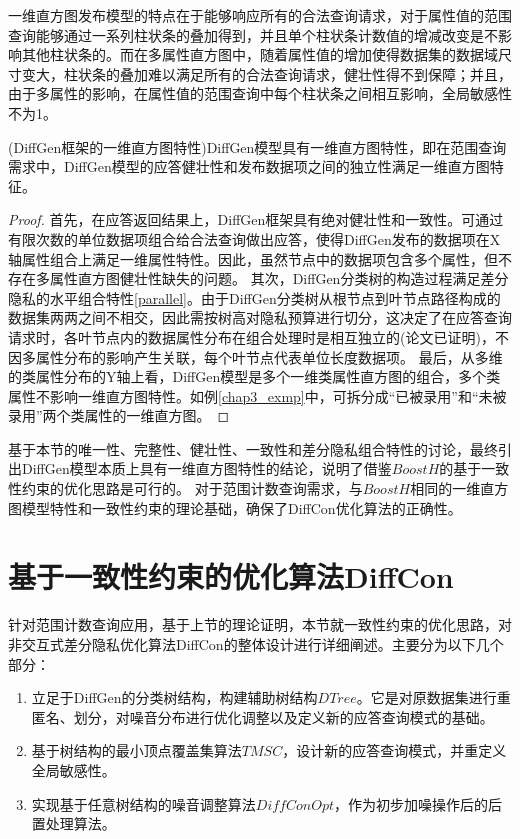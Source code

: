 
一维直方图发布模型的特点在于能够响应所有的合法查询请求，对于属性值的范围查询能够通过一系列柱状条的叠加得到，并且单个柱状条计数值的增减改变是不影响其他柱状条的。而在多属性直方图中，随着属性值的增加使得数据集的数据域尺寸变大，柱状条的叠加难以满足所有的合法查询请求，健壮性得不到保障；并且，由于多属性的影响，在属性值的范围查询中每个柱状条之间相互影响，全局敏感性不为1。

\begin{prop}
	\label{chap4_prop4}
	(DiffGen框架的一维直方图特性)DiffGen模型具有一维直方图特性，即在范围查询需求中，DiffGen模型的应答健壮性和发布数据项之间的独立性满足一维直方图特征。
\end{prop}
\begin{proof}
	首先，在应答返回结果上，DiffGen框架具有绝对健壮性和一致性。可通过有限次数的单位数据项组合给合法查询做出应答，使得DiffGen发布的数据项在X轴属性组合上满足一维属性特性。因此，虽然节点中的数据项包含多个属性，但不存在多属性直方图健壮性缺失的问题。%
	其次，DiffGen分类树的构造过程满足差分隐私的水平组合特性\ref{parallel}。由于DiffGen分类树从根节点到叶节点路径构成的数据集两两之间不相交，因此需按树高对隐私预算进行切分，这决定了在应答查询请求时，各叶节点内的数据属性分布在组合处理时是相互独立的(论文\cite{DiffGen}已证明)，不因多属性分布的影响产生关联，每个叶节点代表单位长度数据项。
	最后，从多维的类属性分布的Y轴上看，DiffGen模型是多个一维类属性直方图的组合，多个类属性不影响一维直方图特性。如例\ref{chap3_exmp}中，可拆分成“已被录用”和“未被录用”两个类属性的一维直方图。
\end{proof}

基于本节的唯一性、完整性、健壮性、一致性和差分隐私组合特性的讨论，最终引出DiffGen模型本质上具有一维直方图特性的结论，说明了借鉴$BoostH$的基于一致性约束的优化思路是可行的。
对于范围计数查询需求，与$BoostH$相同的一维直方图模型特性和一致性约束的理论基础，确保了DiffCon优化算法的正确性。


\section{基于一致性约束的优化算法DiffCon}


针对范围计数查询应用，基于上节的理论证明，本节就一致性约束的优化思路，对非交互式差分隐私优化算法DiffCon的整体设计进行详细阐述。主要分为以下几个部分：
\begin{enumerate}
	\item 立足于DiffGen的分类树结构，构建辅助树结构$DTree$。它是对原数据集进行重匿名、划分，对噪音分布进行优化调整以及定义新的应答查询模式的基础。
	\item 基于树结构的最小顶点覆盖集算法$TMSC$，设计新的应答查询模式，并重定义全局敏感性。
	\item 实现基于任意树结构的噪音调整算法$DiffConOpt$，作为初步加噪操作后的后置处理算法。
\end{enumerate}


